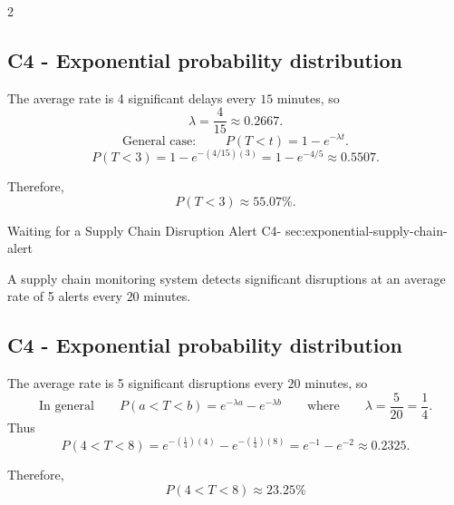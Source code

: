 \begin{multicols}{2}
{			
			
			\label{subsec:exponential-public-transport-alert-probability}
			\subsection*{C4 - Exponential probability distribution }
			\vspace{-3mm}
			The average rate is 4 significant delays every \(15\) minutes, so
			\[
			\lambda=\frac{4}{15}\approx0.2667.
			\]
			\[
			\text{General case: } \qquad P(T<t)=1-e^{-\lambda t}.
			\]
			\[
			P(T<3)
			=1-e^{-(4/15)(3)}
			=1-e^{-4/5}
			\approx0.5507.
			\]
			
			Therefore,
			\[
			\boxed{P(T<3)\approx55.07\%}.
			\]
			
			\vspace{-5mm}
		}
			
	\end{multicols}
	
	\sectionScored
	{Waiting for a Supply Chain Disruption Alert}
	{C4-}
	{sec:exponential-supply-chain-alert}
	{
		A supply chain monitoring system detects significant disruptions at an
		average rate of 5 alerts every \(20\) minutes.
		
		
		\label{subsec:exponential-supply-chain-alert-probability}
		\subsection*{C4 - Exponential probability distribution }
		
		The average rate is 5 significant disruptions every \(20\) minutes, so
		\[
		\text{In general} \qquad
		P(a<T<b)=e^{-\lambda a}-e^{-\lambda b}
		\qquad \text{where} \qquad
		\lambda=\frac{5}{20}=\frac{1}{4}.
		\]
		Thus
		\[
		P(4<T<8)
		=
		e^{-\left(\frac{1}{4}\right)(4)}
		-
		e^{-\left(\frac{1}{4}\right)(8)}
		=
		e^{-1}-e^{-2}
		\approx0.2325.
		\]
		
		Therefore,
		\[
		\boxed{P(4<T<8)\approx23.25\%}
		\]
		
		\vspace{-5mm}
	}
	
